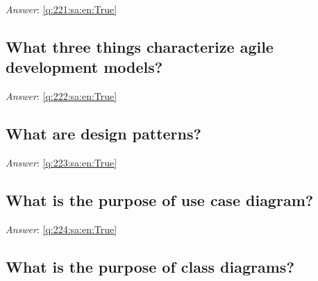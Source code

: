 \documentclass[a4paper,11pt,oneside]{article}
\begin{document}
\begin{sloppypar}
\vspace{2cm}

\noindent\makebox[\textwidth]{\hrulefill}

\vspace{1cm}

\textit{Answer}: \autoref{q:221:sa:en:True}



\subsection{What three things characterize agile development models?}

\label{q:222:sa:en:False}

\vspace{2cm}

\noindent\makebox[\textwidth]{\hrulefill}

\vspace{1cm}

\textit{Answer}: \autoref{q:222:sa:en:True}



\subsection{What are design patterns?}

\label{q:223:sa:en:False}

\vspace{2cm}

\noindent\makebox[\textwidth]{\hrulefill}

\vspace{1cm}

\textit{Answer}: \autoref{q:223:sa:en:True}



\subsection{What is the purpose of use case diagram?}

\label{q:224:sa:en:False}

\vspace{2cm}

\noindent\makebox[\textwidth]{\hrulefill}

\vspace{1cm}

\textit{Answer}: \autoref{q:224:sa:en:True}



\subsection{What is the purpose of class diagrams?}


\end{sloppypar}
\end{document}
